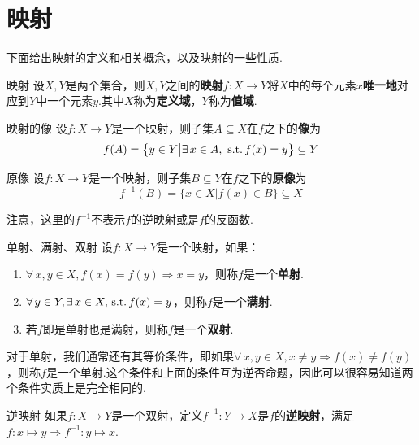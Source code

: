 \section{映射}

下面给出映射的定义和相关概念，以及映射的一些性质.

\begin{definition}{映射}
    设$X,Y$是两个集合，则$X,Y$之间的\textbf{映射}$f:X\to Y$将$X$中的每个元素$x$\textbf{唯一地}对应到$Y$中一个元素$y$.其中$X$称为\textbf{定义域}，$Y$称为\textbf{值域}.
\end{definition}

\begin{definition}{映射的像}
    设$f:X\to Y$是一个映射，则子集$A\subseteq X$在$f$之下的\textbf{像}为
    \[f(A)=\big\{y\in Y\big|\exists\, x\in A,\,\operatorname{\,\text{s.t.}} f(x)=y \big\}\subseteq Y\]
\end{definition}

\begin{definition}{原像}
    设$f:X\to Y$是一个映射，则子集$B\subseteq Y$在$f$之下的\textbf{原像}为
    \[f^{-1}(B)=\big\{x\in X\big|f(x)\in B \big\}\subseteq X\]
\end{definition}

\begin{notice}
    注意，这里的$f^{-1}$不表示$f$的逆映射或是$f$的反函数.
\end{notice}

\begin{definition}{单射、满射、双射}
    设$f:X\to Y$是一个映射，如果：
    \begin{enumerate}
        \item $\forall\, x,y\in X,f(x)=f(y)\Rightarrow x=y$，则称$f$是一个\textbf{单射}.
        \item $\forall\,y\in Y,\exists\, x\in X,\operatorname{\,\text{s.t.}} f(x)=y$，则称$f$是一个\textbf{满射}.
        \item 若$f$即是单射也是满射，则称$f$是一个\textbf{双射}.
    \end{enumerate}
\end{definition}
对于单射，我们通常还有其等价条件，即如果$\forall\, x,y\in X,x\neq y\Rightarrow f(x)\neq f(y)$，则称$f$是一个单射.这个条件和上面的条件互为逆否命题，因此可以很容易知道两个条件实质上是完全相同的.





\begin{definition}{逆映射}
    如果$f:X\to Y$是一个双射，定义$f^{-1}:Y\to X$是$f$的\textbf{逆映射}，满足$f:x\mapsto y \Rightarrow f^{-1}:y\mapsto x$.
\end{definition}

